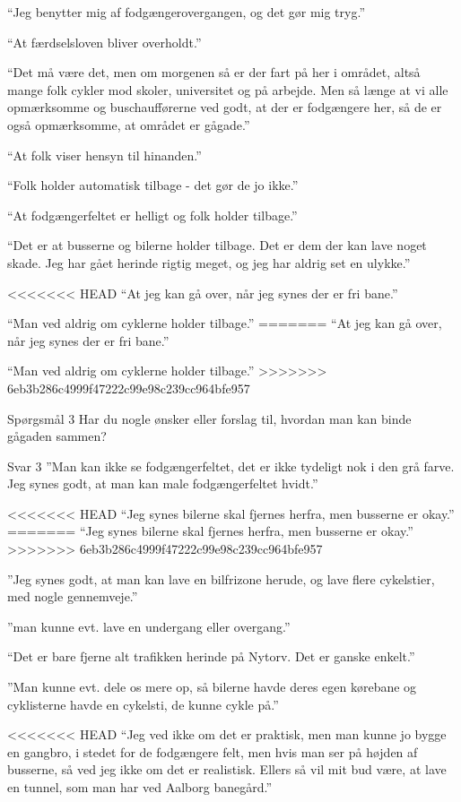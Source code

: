 \begin{appendics}
\begin{appendics}
“Jeg benytter mig af fodgængerovergangen, og det gør mig tryg.”

“At færdselsloven bliver overholdt.”

“Det må være det, men om morgenen så er der fart på her i området, altså mange folk cykler mod skoler, universitet og på arbejde. Men så længe at vi alle opmærksomme og buschaufførerne ved godt, at der er fodgængere her, så de er også opmærksomme, at området er gågade.”

“At folk viser hensyn til hinanden.”

“Folk holder automatisk tilbage - det gør de jo ikke.”

“At fodgængerfeltet er helligt og folk holder tilbage.”

“Det er at busserne og bilerne holder tilbage. Det er dem der kan lave noget skade. Jeg har gået herinde rigtig meget, og jeg har aldrig set en ulykke.”

<<<<<<< HEAD
“At jeg kan gå over, når jeg synes der er fri bane.”

“Man ved aldrig om cyklerne holder tilbage.”
=======
“At jeg kan gå over, når jeg synes der er fri bane.” 

“Man ved aldrig om cyklerne holder tilbage.” 
>>>>>>> 6eb3b286c4999f47222c99e98c239cc964bfe957

Spørgsmål 3
Har du nogle ønsker eller forslag til, hvordan man kan binde gågaden sammen?

Svar 3
”Man kan ikke se fodgængerfeltet, det er ikke tydeligt nok i den grå farve. Jeg synes godt, at man kan male fodgængerfeltet hvidt.”

<<<<<<< HEAD
“Jeg synes bilerne skal fjernes herfra, men busserne er okay.”
=======
“Jeg synes bilerne skal fjernes herfra, men busserne er okay.” 
>>>>>>> 6eb3b286c4999f47222c99e98c239cc964bfe957

”Jeg synes godt, at man kan lave en bilfrizone herude, og lave flere cykelstier, med nogle gennemveje.”

”man kunne evt. lave en undergang eller overgang.”

“Det er bare fjerne alt trafikken herinde på Nytorv. Det er ganske enkelt.”

”Man kunne evt. dele os mere op, så bilerne havde deres egen kørebane og cyklisterne havde en cykelsti, de kunne cykle på.”

<<<<<<< HEAD
“Jeg ved ikke om det er praktisk, men man kunne jo bygge en gangbro, i stedet for de fodgængere felt, men hvis man ser på højden af busserne, så ved jeg ikke om det er realistisk. Ellers så vil mit bud være, at lave en tunnel, som man har ved Aalborg banegård.”


\end{appendics}
\end{appendics}

